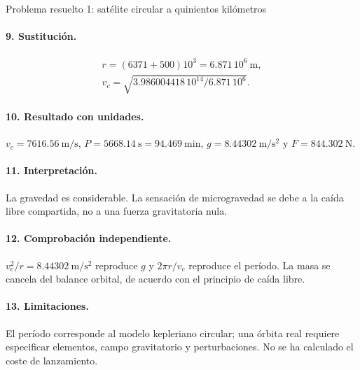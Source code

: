 \begin{studiumworked}{Problema resuelto 1: satélite circular a quinientos kilómetros}
\paragraph{9. Sustitución.} \[\begin{gathered}r=(6371+500)10^3=6.871\,10^6\ \mathrm m,\\ v_c=\sqrt{3.986004418\,10^{14}/6.871\,10^6}.\end{gathered}\]
\paragraph{10. Resultado con unidades.} $v_c=7616.56\ \mathrm{m/s}$, $P=5668.14\ \mathrm s=94.469\ \mathrm{min}$, $g=8.44302\ \mathrm{m/s^2}$ y $F=844.302\ \mathrm N$.
\paragraph{11. Interpretación.} La gravedad es considerable. La sensación de microgravedad se debe a la caída libre compartida, no a una fuerza gravitatoria nula.
\paragraph{12. Comprobación independiente.} $v_c^2/r=8.44302\ \mathrm{m/s^2}$ reproduce $g$ y $2\pi r/v_c$ reproduce el período. La masa se cancela del balance orbital, de acuerdo con el principio de caída libre.
\paragraph{13. Limitaciones.} El período corresponde al modelo kepleriano circular; una órbita real requiere especificar elementos, campo gravitatorio y perturbaciones. No se ha calculado el coste de lanzamiento.


\end{studiumworked}

